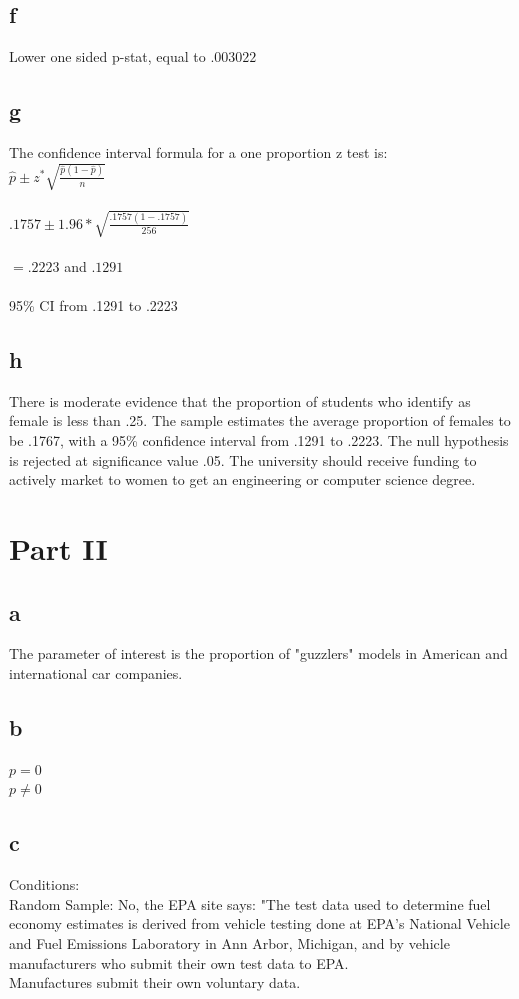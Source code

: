 \documentclass[10pt,letterpaper]{article}
\begin{document}
\subsection*{f}
Lower one sided p-stat, equal to $.003022$

\subsection*{g}
The confidence interval formula for a one proportion z test is:\\
$\hat{p} \pm z^* \sqrt{\frac{\hat{p}(1-\hat{p})}{n}}$\\\\
$.1757 \pm 1.96 * \sqrt{\frac{.1757(1-.1757)}{256}}$\\\\
$=.2223$ and $.1291$\\\\

95\% CI from .1291 to .2223

\subsection*{h}
There is moderate evidence that the proportion of students who identify as
female is less than .25. The sample estimates the average proportion of females
to be .1767, with a 95\% confidence interval from .1291 to .2223. The null
hypothesis is rejected at significance value .05. The university should receive
funding to actively market to women to get an engineering or computer science
degree.

\section*{Part II}
\subsection*{a}
The parameter of interest is the proportion of "guzzlers" models in American
and international car companies. 
\subsection*{b}
$p=0$\\
$p \neq 0$\\
\subsection*{c}
Conditions:\\
Random Sample: No, the EPA site says: "The test data used to determine fuel
economy estimates is derived from vehicle testing done at EPA's National Vehicle
and Fuel Emissions Laboratory in Ann Arbor, Michigan, and by vehicle
manufacturers who submit their own test data to EPA.\\
Manufactures submit their own voluntary data. 
\end{document}
